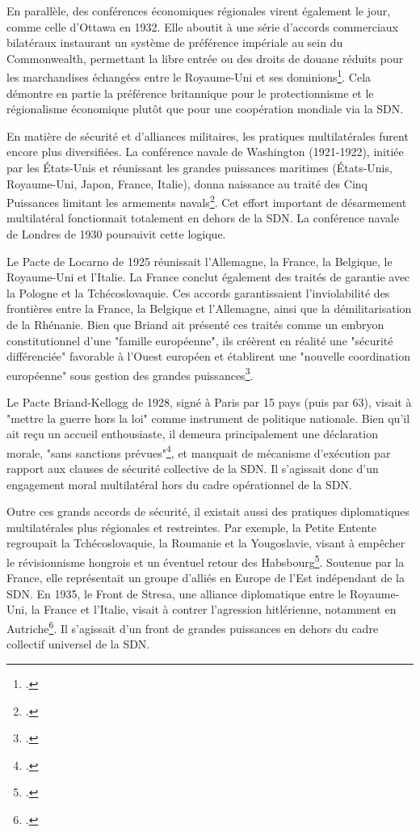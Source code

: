 \documentclass[a4paper,twoside,12pt]{book}
\begin{document}
En parallèle, des conférences économiques régionales virent également le jour, comme celle d'Ottawa en 1932. Elle aboutit à une série d'accords commerciaux bilatéraux instaurant un système de préférence impériale au sein du Commonwealth, permettant la libre entrée ou des droits de douane réduits pour les marchandises échangées entre le Royaume-Uni et ses dominions\footcite[p.126-27]{milza2019}. Cela démontre en partie la préférence britannique pour le protectionnisme et le régionalisme économique plutôt que pour une coopération mondiale via la SDN.

En matière de sécurité et d'alliances militaires, les pratiques multilatérales furent encore plus diversifiées. La conférence navale de Washington (1921-1922), initiée par les États-Unis et réunissant les grandes puissances maritimes (États-Unis, Royaume-Uni, Japon, France, Italie), donna naissance au traité des Cinq Puissances limitant les armements navals\footcite[p.229-230]{guieu2016}. Cet effort important de désarmement multilatéral fonctionnait totalement en dehors de la SDN. La conférence navale de Londres de 1930 poursuivit cette logique.

Le Pacte de Locarno de 1925 réunissait l'Allemagne, la France, la Belgique, le Royaume-Uni et l'Italie. La France conclut également des traités de garantie avec la Pologne et la Tchécoslovaquie. Ces accords garantissaient l'inviolabilité des frontières entre la France, la Belgique et l'Allemagne, ainsi que la démilitarisation de la Rhénanie. Bien que Briand ait présenté ces traités comme un embryon constitutionnel d'une "famille européenne", ils créèrent en réalité une "sécurité différenciée" favorable à l'Ouest européen et établirent une "nouvelle coordination européenne" sous gestion des grandes puissances\footcite[p.447-448]{guieu2016}.

Le Pacte Briand-Kellogg de 1928, signé à Paris par 15 pays (puis par 63), visait à "mettre la guerre hors la loi" comme instrument de politique nationale. Bien qu'il ait reçu un accueil enthousiaste, il demeura principalement une déclaration morale, "sans sanctions prévues"\footcite[p.457-458]{guieu2016}, et manquait de mécanisme d'exécution par rapport aux clauses de sécurité collective de la SDN. Il s'agissait donc d'un engagement moral multilatéral hors du cadre opérationnel de la SDN.

Outre ces grands accords de sécurité, il existait aussi des pratiques diplomatiques multilatérales plus régionales et restreintes. Par exemple, la Petite Entente regroupait la Tchécoslovaquie, la Roumanie et la Yougoslavie, visant à empêcher le révisionnisme hongrois et un éventuel retour des Habsbourg\footcite[p.43]{milza2019}. Soutenue par la France, elle représentait un groupe d'alliés en Europe de l'Est indépendant de la SDN. En 1935, le Front de Stresa, une alliance diplomatique entre le Royaume-Uni, la France et l'Italie, visait à contrer l'agression hitlérienne, notamment en Autriche\footcite{mougel2018}. Il s'agissait d'un front de grandes puissances en dehors du cadre collectif universel de la SDN.
\end{document}

